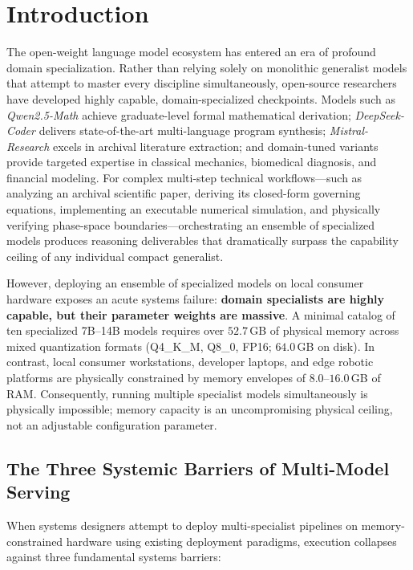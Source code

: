 \section{Introduction}
\label{sec:introduction}

The open-weight language model ecosystem has entered an era of profound domain specialization. Rather than relying solely on monolithic generalist models that attempt to master every discipline simultaneously, open-source researchers have developed highly capable, domain-specialized checkpoints. Models such as \textit{Qwen2.5-Math} achieve graduate-level formal mathematical derivation; \textit{DeepSeek-Coder} delivers state-of-the-art multi-language program synthesis; \textit{Mistral-Research} excels in archival literature extraction; and domain-tuned variants provide targeted expertise in classical mechanics, biomedical diagnosis, and financial modeling. For complex multi-step technical workflows—such as analyzing an archival scientific paper, deriving its closed-form governing equations, implementing an executable numerical simulation, and physically verifying phase-space boundaries—orchestrating an ensemble of specialized models produces reasoning deliverables that dramatically surpass the capability ceiling of any individual compact generalist.

However, deploying an ensemble of specialized models on local consumer hardware exposes an acute systems failure: \textbf{domain specialists are highly capable, but their parameter weights are massive}. A minimal catalog of ten specialized 7B--14B models requires over $52.7$\,GB of physical memory across mixed quantization formats (Q4\_K\_M, Q8\_0, FP16; $64.0$\,GB on disk). In contrast, local consumer workstations, developer laptops, and edge robotic platforms are physically constrained by memory envelopes of $8.0\text{--}16.0$\,GB of RAM. Consequently, running multiple specialist models simultaneously is physically impossible; memory capacity is an uncompromising physical ceiling, not an adjustable configuration parameter.

\subsection{The Three Systemic Barriers of Multi-Model Serving}
\label{sec:intro_barriers}

When systems designers attempt to deploy multi-specialist pipelines on memory-constrained hardware using existing deployment paradigms, execution collapses against three fundamental systems barriers:

